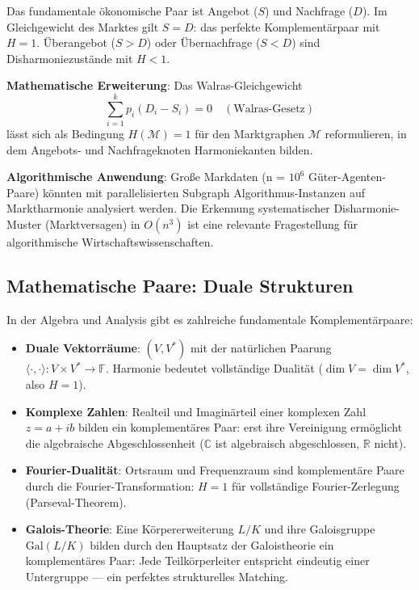 ﻿\documentclass[a4paper,12pt]{article}
\theoremstyle{definition}
\begin{document}
Das fundamentale ökonomische Paar ist Angebot ($S$) und Nachfrage ($D$).
Im Gleichgewicht des Marktes gilt $S = D$: das perfekte Komplementärpaar mit $H = 1$.
Überangebot ($S > D$) oder Übernachfrage ($S < D$) sind Disharmoniezustände mit $H < 1$.

\textbf{Mathematische Erweiterung}: Das Walras-Gleichgewicht \cite{lotka1925}
\[
	\sum_{i=1}^k p_i (D_i - S_i) = 0 \quad (\text{Walras-Gesetz})
\]
lässt sich als Bedingung $H(\mathcal{M}) = 1$ für den Marktgraphen $\mathcal{M}$
reformulieren, in dem Angebots- und Nachfrageknoten Harmoniekanten bilden.

\textbf{Algorithmische Anwendung}: Große Markdaten (n = $10^6$ Güter-Agenten-Paare)
könnten mit parallelisierten Subgraph Algorithmus-Instanzen auf Marktharmonie
analysiert werden. Die Erkennung systematischer Disharmonie-Muster (Marktversagen)
in $O(n^3)$ ist eine relevante Fragestellung für algorithmische Wirtschaftswissenschaften.

\subsection{Mathematische Paare: Duale Strukturen}

In der Algebra und Analysis gibt es zahlreiche fundamentale Komplementärpaare:
\begin{itemize}
	\item \textbf{Duale Vektorräume}: $(V, V^*)$ mit der natürlichen Paarung
	$\langle \cdot, \cdot \rangle: V \times V^* \to \mathbb{F}$. Harmonie bedeutet
	vollständige Dualität ($\dim V = \dim V^*$, also $H = 1$).
	
	\item \textbf{Komplexe Zahlen}: Realteil und Imaginärteil einer komplexen Zahl
	$z = a + ib$ bilden ein komplementäres Paar: erst ihre Vereinigung ermöglicht
	die algebraische Abgeschlossenheit ($\mathbb{C}$ ist algebraisch abgeschlossen,
	$\mathbb{R}$ nicht).
	
	\item \textbf{Fourier-Dualität}: Ortsraum und Frequenzraum sind komplementäre
	Paare durch die Fourier-Transformation: $H = 1$ für vollständige Fourier-Zerlegung
	(Parseval-Theorem).
	
	\item \textbf{Galois-Theorie}: Eine Körpererweiterung $L/K$ und ihre Galoisgruppe
	$\text{Gal}(L/K)$ bilden durch den Hauptsatz der Galoistheorie ein komplementäres
	Paar: Jede Teilkörperleiter entspricht eindeutig einer Untergruppe --- ein perfektes
	strukturelles Matching.
\end{itemize}
\end{document}
